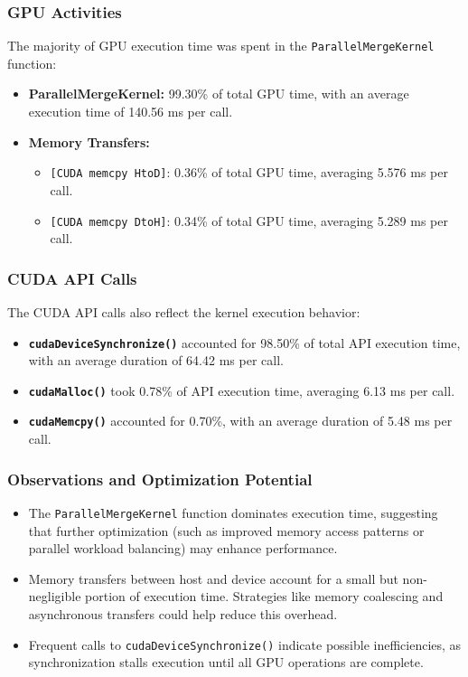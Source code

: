\documentclass{article}
\begin{document}
\subsubsection{GPU Activities}
The majority of GPU execution time was spent in the \texttt{ParallelMergeKernel} function:
\begin{itemize}
    \item \textbf{ParallelMergeKernel:} 99.30\% of total GPU time, with an average execution time of 140.56 ms per call.
    \item \textbf{Memory Transfers:}
    \begin{itemize}
        \item \texttt{[CUDA memcpy HtoD]}: 0.36\% of total GPU time, averaging 5.576 ms per call.
        \item \texttt{[CUDA memcpy DtoH]}: 0.34\% of total GPU time, averaging 5.289 ms per call.
    \end{itemize}
\end{itemize}

\subsubsection{CUDA API Calls}
The CUDA API calls also reflect the kernel execution behavior:
\begin{itemize}
    \item \textbf{\texttt{cudaDeviceSynchronize()}} accounted for 98.50\% of total API execution time, with an average duration of 64.42 ms per call.
    \item \textbf{\texttt{cudaMalloc()}} took 0.78\% of API execution time, averaging 6.13 ms per call.
    \item \textbf{\texttt{cudaMemcpy()}} accounted for 0.70\%, with an average duration of 5.48 ms per call.
\end{itemize}

\subsubsection{Observations and Optimization Potential}
\begin{itemize}
    \item The \texttt{ParallelMergeKernel} function dominates execution time, suggesting that further optimization (such as improved memory access patterns or parallel workload balancing) may enhance performance.
    \item Memory transfers between host and device account for a small but non-negligible portion of execution time. Strategies like memory coalescing and asynchronous transfers could help reduce this overhead.
    \item Frequent calls to \texttt{cudaDeviceSynchronize()} indicate possible inefficiencies, as synchronization stalls execution until all GPU operations are complete.
\end{itemize}
\end{document}
